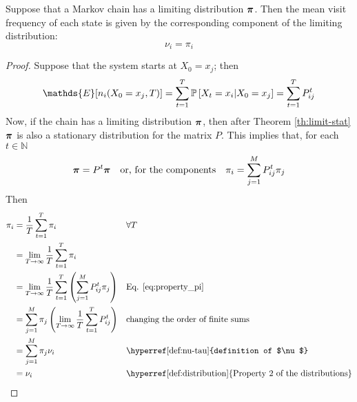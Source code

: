 \begin{theorem}
    Suppose that a Markov chain has a limiting distribution $\boldsymbol{\pi}$. Then the mean visit frequency of each state is given by the corresponding component of the limiting distribution:
    \begin{equation}
        \nu_i = \pi_i
    \end{equation}
\end{theorem}
\begin{proof}
   Suppose that the system starts at $X_0 = x_j$; then 
    \begin{equation} \label{eq:expected_value}
        \mathds{E} [ n_i (X_0 = x_j, T)] = \sum_{t = 1}^T \prob{X_t = x_i | X_0 = x_j} = \sum_{t = 1}^T P_{ij}^t
    \end{equation} 
    Now, if the chain has a limiting distribution $\boldsymbol{\pi}$, then after Theorem \ref{th:limit-stat} $\boldsymbol{\pi}$ is also a stationary distribution for the matrix $P$. This implies that, for each $t\in \mathbb{N}$
    \begin{equation} \label{eq:property_pi}
        \boldsymbol{\pi} = P^t \boldsymbol{\pi}  \quad \text{or, for the components}\quad \pi_i = \sum_{j = 1}^M P_{ij}^t \pi_{j}
    \end{equation}
    Then
        \begin{align}
            \pi_i 
                &  = \frac{1}{T} \sum_{t = 1}^T \pi_i && \forall T\\
                &  = \lim_{T \rightarrow \infty} \frac{1}{T} \sum_{t = 1}^T \pi_i \\
                & = \lim_{T \rightarrow \infty}  \frac{1}{T} \sum_{t = 1}^T \left(\sum_{j = 1}^M P_{ij}^t \pi_{j}\right) &&  \text{Eq. \ref{eq:property_pi}}\\
                & = \sum_{j = 1}^M \pi_j \left(\lim_{T \rightarrow \infty}  \frac{1}{T}  \sum_{t = 1}^T P_{ij}^t \right) && \text{changing the order of finite sums} \\
                & = \sum_{j = 1}^M \pi_j \nu_i && \text{\hyperref[def:nu-tau]{definition of $\nu$}} \\
                & = \nu_i && \text{\hyperref[def:distribution] {Property 2  of the distributions}}
        \end{align}
\end{proof}